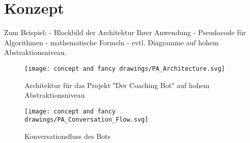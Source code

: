 \chapter{Konzept}

Zum Beispiel:  
- Blockbild der Architektur Ihrer Anwendung  
- Pseudocode für Algorithmen  
- mathematische Formeln  
- evtl. Diagramme auf hohem Abstraktionsniveau.  




\begin{figure} %
	\centering
	\texttt{[image: concept and fancy drawings/PA\_Architecture.svg]}
	\caption{Architektur für das Projekt "Der Coaching Bot" auf hohem Abstraktionsniveau}
	\label{architecture}
\end{figure}


\begin{figure} %
	\centering
	\texttt{[image: concept and fancy drawings/PA\_Conversation\_Flow.svg]}
	\caption{Konversationsfluss des Bots}
	\label{conversationFlow}
\end{figure}

